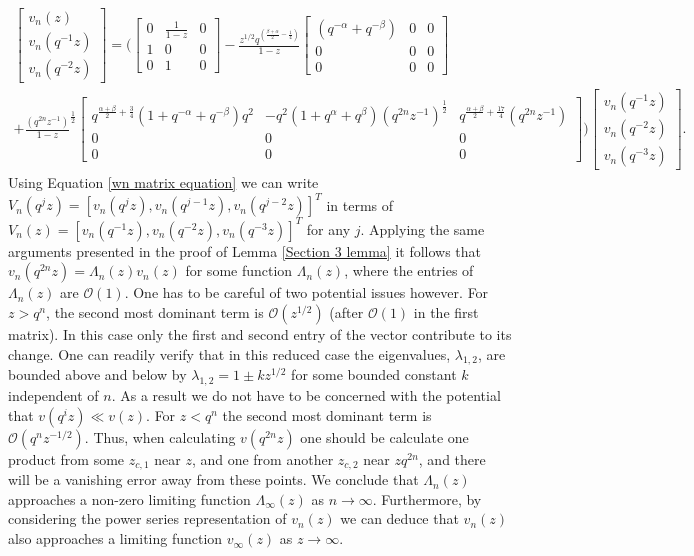 \documentclass[a4paper,reqno]{amsart}
\numberwithin{equation}{section}
\numberwithin{figure}{section}
\begin{document}
\begin{multline}\label{wn matrix equation}
   \begin{bmatrix}
   v_n(z)\\
   v_n(q^{-1}z)\\
   v_n(q^{-2}z)
 \end{bmatrix}= \Bigg(\begin{bmatrix}
   0 & \frac{1}{1-z} &0\\
   1&0&0 \\
   0&1&0
   \end{bmatrix}
   -\frac{z^{1/2}q^{(\frac{\beta+\alpha}{2}-\frac{1}{4}) }}{1-z} \begin{bmatrix}
   (q^{-\alpha}+q^{-\beta}) & 0 & 0\\
   0&0&0 \\
   0&0&0
   \end{bmatrix}  \\
   +\frac{\left(q^{2n}z^{-1}\right)}{1-z}^{\frac{1}{2}}\begin{bmatrix}
   q^{\frac{\alpha+\beta}{2}+\frac{3}{4}}(1+q^{-\alpha}+q^{-\beta})q^2 & -q^2(1+q^{\alpha} + q^{\beta})\left(q^{2n}z^{-1}\right)^{\frac{1}{2}} &q^{\frac{\alpha+\beta}{2}+\frac{17}{4}}\left(q^{2n}z^{-1}\right)\\
   0&0&0 \\
   0&0&0
   \end{bmatrix}
 \Bigg)
 \begin{bmatrix}
   v_n(q^{-1}z)\\
   v_n(q^{-2}z)\\
   v_n(q^{-3}z)
 \end{bmatrix}.
 \end{multline}
Using Equation \eqref{wn matrix equation} we can write $V_n(q^jz) = [v_n(q^{j}z), v_n(q^{j-1}z),v_n(q^{j-2}z)]^T$ in terms of \\ $V_n(z) = [v_n(q^{-1}z), v_n(q^{-2}z),v_n(q^{-3}z)]^T$ for any $j$. Applying the same arguments presented in the proof of Lemma \ref{Section 3 lemma} it follows that $v_n(q^{2n}z) = \Lambda_{n}(z)v_n(z)$ for some function $\Lambda_{n}(z)$, where the entries of $\Lambda_n(z)$ are $\mathcal{O}(1)$. One has to be careful of two potential issues however. For $z>q^n$, the second most dominant term is $\mathcal{O}(z^{1/2})$ (after $\mathcal{O}(1)$ in the first matrix). In this case only the first and second entry of the vector contribute to its change. One can readily verify that in this reduced case the eigenvalues, $\lambda_{1,2}$, are bounded above and below by $\lambda_{1,2} = 1\pm kz^{1/2}$ for some bounded constant $k$ independent of $n$. As a result we do not have to be concerned with the potential that $v(q^iz)\ll v(z)$. For $z<q^n$ the second most dominant term is $\mathcal{O}(q^nz^{-1/2})$. Thus, when calculating $v(q^{2n}z)$ one should be calculate one product from some $z_{c,1}$ near $z$, and one from another $z_{c,2}$ near $zq^{2n}$, and there will be a vanishing error away from these points. We conclude that $\Lambda_{n}(z)$ approaches a non-zero limiting function $\Lambda_{\infty}(z)$ as $n\to\infty$. Furthermore, by considering the power series representation of $v_n(z)$ we can deduce that $v_n(z)$ also approaches a limiting function $v_\infty(z)$ as $z\to\infty$. \\  
\end{document}
